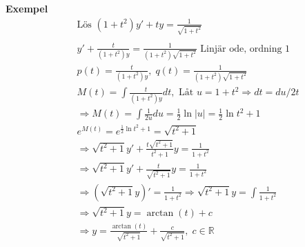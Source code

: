 \textbf{Exempel} 
\begin{align*}
  &\quad  \text{Lös } (1+t^2)y' + ty = \frac{1}{\sqrt{1+t^2}} \\
  &\quad  \\
  &\quad  y'+\frac{t}{(1+t^2)y} = \frac{1}{(1+t^2)\sqrt{1+t^2}} \text{ Linjär ode, ordning 1} \\
  &\quad  p(t)=\frac{t}{(1+t^2)y}, \; q(t)=\frac{1}{(1+t^2)\sqrt{1+t^2}} \\
  &\quad  M(t) = \int \frac{t}{(1+t^2)y}dt, \text{ Låt } u=1+t^2 \Rightarrow dt = du/2t \\
  &\quad  \Rightarrow M(t)=\int\frac{1}{2u}du = \frac{1}{2}\ln{|u|} = \frac{1}{2}\ln{t^2+1} \\
  &\quad  e^{M(t)}=e^{\frac{1}{2}\ln{t^2+1}}=\sqrt{t^2+1} \\
  &\quad  \Rightarrow \sqrt{t^2+1}y'+\frac{t\sqrt{t^2+1}}{t^2+1}y = \frac{1}{1+t^2} \\
  &\quad  \Rightarrow \sqrt{t^2+1}y'+\frac{t}{\sqrt{t^2+1}}y = \frac{1}{1+t^2} \\
  &\quad  \Rightarrow (\sqrt{t^2+1}y)' = \frac{1}{1+t^2} \Rightarrow \sqrt{t^2+1}y = \int\frac{1}{1+t^2} \\
  &\quad  \Rightarrow \sqrt{t^2+1}y = \arctan{(t)} +c \\
  &\quad  \Rightarrow y = \frac{\arctan{(t)}}{\sqrt{t^2+1}} +\frac{c}{{\sqrt{t^2+1}}}, \; c\in\mathbb{R} \\
\end{align*}



